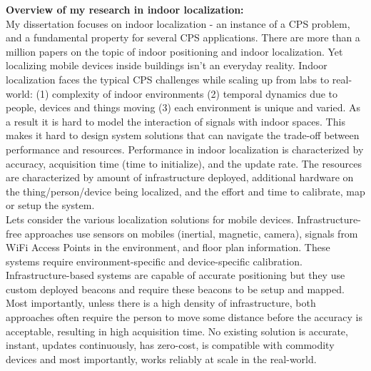 \documentclass[10pt]{article}
\begin{document}
\textbf{Overview of my research in indoor localization:}\\
My dissertation focuses on indoor localization - an instance of a CPS problem, and a fundamental property for several CPS applications. %
There are more than a million papers on the topic of indoor positioning and indoor localization. Yet localizing mobile devices inside buildings isn't an everyday reality. Indoor localization faces the typical CPS challenges while scaling up from labs to real-world: (1) complexity of indoor environments (2) temporal dynamics due to people, devices and things moving (3) each environment is unique and varied. As a result it is hard to model the interaction of signals with indoor spaces. This makes it hard to design system solutions that can navigate the trade-off between performance and resources. %
Performance in indoor localization is characterized by accuracy, acquisition time (time to initialize), and the update rate. The resources are characterized by amount of infrastructure deployed, additional hardware on the thing/person/device being localized, and the effort and time to calibrate, map or setup the system.  \\%
Lets consider the various localization solutions for mobile devices. Infrastructure-free approaches use sensors on mobiles (inertial, magnetic, camera), signals from WiFi Access Points in the environment, and floor plan information. These systems require environment-specific and device-specific calibration. Infrastructure-based systems are capable of accurate positioning but they use custom deployed beacons and require these beacons to be setup and mapped. Most importantly, unless there is a high density of infrastructure, both approaches often require the person to move some distance before the accuracy is acceptable, resulting in high acquisition time. No existing solution is accurate, instant, updates continuously, has zero-cost, is compatible with commodity devices and most importantly, works reliably at scale in the real-world. \\

\end{document}
